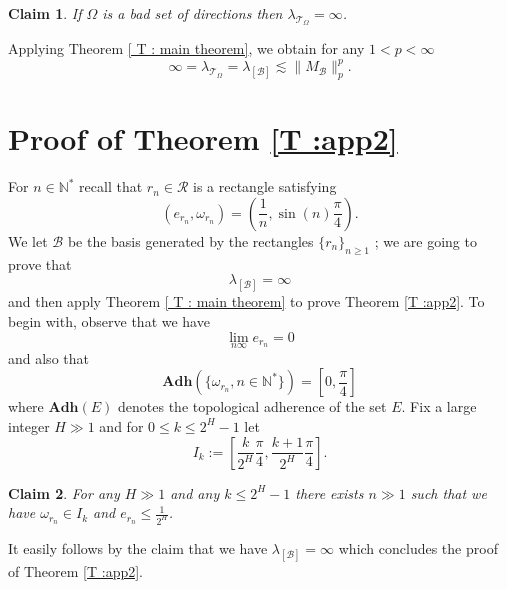 \documentclass{article}
\newtheorem*{claim}{Claim}
\begin{document}
\begin{claim}
If $\Omega$ is a bad set of directions then $\lambda_{ \mathcal{T}_\Omega} = \infty$.
\end{claim}

Applying Theorem \ref{ T : main theorem}, we obtain for any $1 < p < \infty$ $$ \infty = \lambda_{\mathcal{T}_\Omega} = \lambda_{[ \mathcal{B}]} \lesssim \|M_\mathcal{B}\|_p^p.$$








\section{Proof of Theorem \ref{T :app2}}


For $n \in \mathbb{N}^*$ recall that $r_n \in \mathcal{R}$ is a rectangle satisfying $$\left( e_{r_n}, \omega_{r_n} \right) = \left( \frac{1}{n} , \sin(n) \frac{\pi}{4} \right).$$ We let $\mathcal{B}$ be the basis generated by the rectangles $\{r_n \}_{ n \geq 1}$ ; we are going to prove that $$ \lambda_{[\mathcal{B}]} = \infty$$ and then apply Theorem \ref{ T : main theorem} to prove Theorem \ref{T :app2}. To begin with, observe that we have $$\lim_{n \infty} e_{r_n} = 0 $$ and also that $$\textbf{Adh}\left( \{ \omega_{r_n} , n \in \mathbb{N}^* \} \right) = [0,\frac{\pi}{4}]$$ where $\textbf{Adh}(E)$ denotes the topological adherence of the set $E$. Fix a large integer $H \gg 1$ and for $0 \leq k \leq 2^H-1$ let $$I_k := [ \frac{k}{2^H} \frac{\pi}{4}, \frac{k+1}{2^H} \frac{\pi}{4}].$$

\begin{claim}
For any $H \gg 1$ and any $ k \leq 2^H-1$ there exists $n \gg 1$ such that we have $\omega_{r_n} \in I_k$ and $e_{r_n} \leq \frac{1}{2^H}$.
\end{claim}


It easily follows by the claim that we have $\lambda_{[\mathcal{B}]} = \infty$ which concludes the proof of Theorem \ref{T :app2}.
\end{document}
